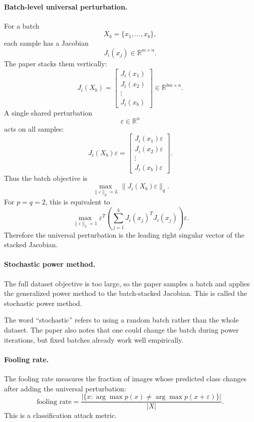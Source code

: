 \documentclass{article}
\begin{document}
\paragraph{Batch-level universal perturbation.}
For a batch
\[
X_b=\{x_1,\dots,x_b\},
\]
each sample has a Jacobian
\[
J_i(x_j)\in\mathbb{R}^{m\times n}.
\]
The paper stacks them vertically:
\[
J_i(X_b)
=
\begin{bmatrix}
J_i(x_1)\\
J_i(x_2)\\
\vdots\\
J_i(x_b)
\end{bmatrix}
\in\mathbb{R}^{bm\times n}.
\]
A single shared perturbation
\[
\varepsilon\in\mathbb{R}^n
\]
acts on all samples:
\[
J_i(X_b)\varepsilon
=
\begin{bmatrix}
J_i(x_1)\varepsilon\\
J_i(x_2)\varepsilon\\
\vdots\\
J_i(x_b)\varepsilon
\end{bmatrix}.
\]
Thus the batch objective is
\[
\max_{\|\varepsilon\|_p=L}
\|J_i(X_b)\varepsilon\|_q.
\]
For \(p=q=2\), this is equivalent to
\[
\max_{\|\varepsilon\|_2=1}
\varepsilon^T
\left(
\sum_{j=1}^b
J_i(x_j)^TJ_i(x_j)
\right)
\varepsilon.
\]
Therefore the universal perturbation is the leading right singular vector of the stacked Jacobian.

\paragraph{Stochastic power method.}
The full dataset objective is too large, so the paper samples a batch and applies the generalized power method to the batch-stacked Jacobian. This is called the stochastic power method.

The word ``stochastic'' refers to using a random batch rather than the whole dataset. The paper also notes that one could change the batch during power iterations, but fixed batches already work well empirically.

\paragraph{Fooling rate.}
The fooling rate measures the fraction of images whose predicted class changes after adding the universal perturbation:
\[
\text{fooling rate}
=
\frac{
\left|
\{x:\arg\max p(x)\neq \arg\max p(x+\varepsilon)\}
\right|
}{
|X|
}.
\]
This is a classification attack metric.
\end{document}
